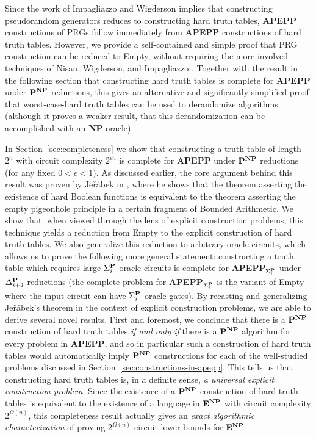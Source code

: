 \documentclass[11pt]{article}
\def\cl{\bf}
\begin{document}
Since the work of Impagliazzo and Wigderson \cite{IW} implies that constructing pseudorandom generators reduces to constructing hard truth tables, {\cl APEPP} constructions of PRGs follow immediately from {\cl APEPP} constructions of hard truth tables. However, we provide a self-contained and simple proof that PRG construction can be reduced to {\sc Empty}, without requiring the more involved techniques of Nisan, Wigderson, and Impagliazzo \cite{NW}\cite{IW}. Together with the result in the following section that constructing hard truth tables is complete for {\cl APEPP} under ${\cl P}^{\cl NP}$ reductions, this gives an alternative and significantly simplified proof that worst-case-hard truth tables can be used to derandomize algorithms (although it proves a weaker result, that this derandomization can be accomplished with an {\cl NP} oracle).

In Section~\ref{sec:completeness} we show that constructing a truth table of length $2^n$ with circuit complexity $2^{\epsilon n}$ is complete for {\cl APEPP} under ${\cl P}^{\cl NP}$ reductions (for any fixed $0 < \epsilon < 1)$. As discussed earlier, the core argument behind this result was proven by Je\v{r}\'{a}bek in \cite{Jerabek}, where he shows that the theorem asserting the existence of hard Boolean functions is equivalent to the theorem asserting the empty pigeonhole principle in a certain fragment of Bounded Arithmetic. We show that, when viewed through the lens of explicit construction problems, this technique yields a reduction from {\sc Empty} to the explicit construction of hard truth tables. We also generalize this reduction to arbitrary oracle circuits, which allows us to prove the following more general statement: constructing a truth table which requires large $\Sigma^{\cl P}_i$-oracle circuits is complete for {\cl APEPP}$_{\Sigma^{\cl P}_i}$ under $\Delta^{\cl P}_{i+2}$ reductions (the complete problem for {\cl APEPP}$_{\Sigma^{\cl P}_i}$ is the variant of {\sc Empty} where the input circuit can have $\Sigma^{\cl P}_i$-oracle gates). By recasting and generalizing Je\v{r}\'{a}bek's theorem in the context of explicit construction problems, we are able to derive several novel results. First and foremost, we conclude that there is a ${\cl P}^{\cl NP}$ construction of hard truth tables \emph{if and only if} there is a ${\cl P}^{\cl NP}$ algorithm for every problem in {\cl APEPP}, and so in particular such a construction of hard truth tables would automatically imply ${\cl P}^{\cl NP}$ constructions for each of the well-studied problems discussed in Section~\ref{sec:constructions-in-apepp}. This tells us that constructing hard truth tables is, in a definite sense, \emph{a universal explicit construction problem}. Since the existence of a ${\cl P}^{\cl NP}$ construction of hard truth tables is equivalent to the existence of a language in ${\cl E}^{\cl NP}$ with circuit complexity $2^{\Omega(n)}$, this completeness result actually gives an \emph{exact algorithmic characterization} of proving $2^{\Omega(n)}$ circuit lower bounds for ${\cl E}^{\cl NP}$:
\end{document}
